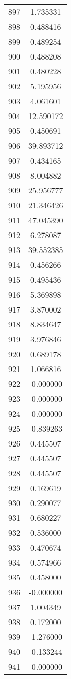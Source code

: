 \documentclass[12pt]{article}
\begin{document}
\begin{longtable}{@{}cc@{}}
897 & 1.735331 \\
898 & 0.488416 \\
899 & 0.489254 \\
900 & 0.488208 \\
901 & 0.480228 \\
902 & 5.195956 \\
903 & 4.061601 \\
904 & 12.590172 \\
905 & 0.450691 \\
906 & 39.893712 \\
907 & 0.434165 \\
908 & 8.004882 \\
909 & 25.956777 \\
910 & 21.346426 \\
911 & 47.045390 \\
912 & 6.278087 \\
913 & 39.552385 \\
914 & 0.456266 \\
915 & 0.495436 \\
916 & 5.369898 \\
917 & 3.870002 \\
918 & 8.834647 \\
919 & 3.976846 \\
920 & 0.689178 \\
921 & 1.066816 \\
922 & -0.000000 \\
923 & -0.000000 \\
924 & -0.000000 \\
925 & -0.839263 \\
926 & 0.445507 \\
927 & 0.445507 \\
928 & 0.445507 \\
929 & 0.169619 \\
930 & 0.290077 \\
931 & 0.680227 \\
932 & 0.536000 \\
933 & 0.470674 \\
934 & 0.574966 \\
935 & 0.458000 \\
936 & -0.000000 \\
937 & 1.004349 \\
938 & 0.172000 \\
939 & -1.276000 \\
940 & -0.133244 \\
941 & -0.000000 \\

\end{longtable}
\end{document}

